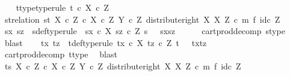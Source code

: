 \begin{isabellebody}
\ \ \isamarkupfalse%
\ t{\isacharunderscore}{\kern0pt}type{\isacharbrackleft}{\kern0pt}type{\isacharunderscore}{\kern0pt}rule{\isacharbrackright}{\kern0pt}{\isacharcolon}{\kern0pt}\ {\isachardoublequoteopen}t\ {\isasymin}\isactrlsub c\ X\ {\isasymtimes}\isactrlsub c\ Z{\isachardoublequoteclose}\isanewline
\ \ \isamarkupfalse%
\ st{\isacharunderscore}{\kern0pt}relation{\isacharcolon}{\kern0pt}\ {\isachardoublequoteopen}{\isasymlangle}s{\isacharcomma}{\kern0pt}t{\isasymrangle}\ {\isasymin}\isactrlbsub {\isacharparenleft}{\kern0pt}X\ {\isasymtimes}\isactrlsub c\ Z{\isacharparenright}{\kern0pt}\ {\isasymtimes}\isactrlsub c\ X\ {\isasymtimes}\isactrlsub c\ Z\isactrlesub \ {\isacharparenleft}{\kern0pt}Y\ {\isasymtimes}\isactrlsub c\ Z{\isacharcomma}{\kern0pt}\ distribute{\isacharunderscore}{\kern0pt}right\ X\ X\ Z\ {\isasymcirc}\isactrlsub c\ m\ {\isasymtimes}\isactrlsub f\ id\isactrlsub c\ Z{\isacharparenright}{\kern0pt}{\isachardoublequoteclose}\isanewline
\ \ \isanewline
\ \ \isamarkupfalse%
\ sx\ sz\ \ s{\isacharunderscore}{\kern0pt}def{\isacharbrackleft}{\kern0pt}type{\isacharunderscore}{\kern0pt}rule{\isacharbrackright}{\kern0pt}{\isacharcolon}{\kern0pt}\ {\isachardoublequoteopen}\ sx\ {\isasymin}\isactrlsub c\ X{\isachardoublequoteclose}\ {\isachardoublequoteopen}sz\ {\isasymin}\isactrlsub c\ Z{\isachardoublequoteclose}\ {\isachardoublequoteopen}s\ {\isacharequal}{\kern0pt}\ \ {\isasymlangle}sx{\isacharcomma}{\kern0pt}sz{\isasymrangle}{\isachardoublequoteclose}\isanewline
\ \ \ \ \isamarkupfalse%
\ cart{\isacharunderscore}{\kern0pt}prod{\isacharunderscore}{\kern0pt}decomp\ s{\isacharunderscore}{\kern0pt}type\ \isamarkupfalse%
\ blast\isanewline
\ \ \isamarkupfalse%
\ tx\ tz\ \ t{\isacharunderscore}{\kern0pt}def{\isacharbrackleft}{\kern0pt}type{\isacharunderscore}{\kern0pt}rule{\isacharbrackright}{\kern0pt}{\isacharcolon}{\kern0pt}\ {\isachardoublequoteopen}tx\ {\isasymin}\isactrlsub c\ X{\isachardoublequoteclose}\ {\isachardoublequoteopen}tz\ {\isasymin}\isactrlsub c\ Z{\isachardoublequoteclose}\ {\isachardoublequoteopen}t\ {\isacharequal}{\kern0pt}\ \ {\isasymlangle}tx{\isacharcomma}{\kern0pt}tz{\isasymrangle}{\isachardoublequoteclose}\isanewline
\ \ \ \ \isamarkupfalse%
\ cart{\isacharunderscore}{\kern0pt}prod{\isacharunderscore}{\kern0pt}decomp\ t{\isacharunderscore}{\kern0pt}type\ \isamarkupfalse%
\ blast\ \isanewline
\isanewline
\ \ \isamarkupfalse%
\ {\isachardoublequoteopen}{\isasymlangle}t{\isacharcomma}{\kern0pt}s{\isasymrangle}\ {\isasymin}\isactrlbsub {\isacharparenleft}{\kern0pt}X\ {\isasymtimes}\isactrlsub c\ Z{\isacharparenright}{\kern0pt}\ {\isasymtimes}\isactrlsub c\ {\isacharparenleft}{\kern0pt}X\ {\isasymtimes}\isactrlsub c\ Z{\isacharparenright}{\kern0pt}\isactrlesub \ {\isacharparenleft}{\kern0pt}Y\ {\isasymtimes}\isactrlsub c\ Z{\isacharcomma}{\kern0pt}\ distribute{\isacharunderscore}{\kern0pt}right\ X\ X\ Z\ {\isasymcirc}\isactrlsub c\ {\isacharparenleft}{\kern0pt}m\ {\isasymtimes}\isactrlsub f\ id\isactrlsub c\ Z{\isacharparenright}{\kern0pt}{\isacharparenright}{\kern0pt}{\isachardoublequoteclose}\ \isanewline

\end{isabellebody}
